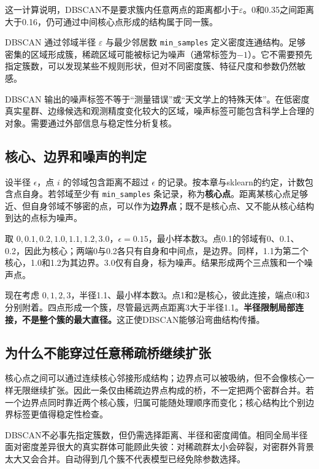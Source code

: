 这一计算说明，DBSCAN不是要求簇内任意两点的距离都小于$\varepsilon$。0和0.35之间距离大于0.16，仍可通过中间核心点形成的结构属于同一簇。

DBSCAN 通过邻域半径 $\varepsilon$ 与最少邻居数 \texttt{min\_samples} 定义密度连通结构。足够密集的区域形成簇，稀疏区域可能被标记为噪声（通常标签为$-1$）。它不需要预先指定簇数，可以发现某些不规则形状，但对不同密度簇、特征尺度和参数仍然敏感。


DBSCAN 输出的噪声标签不等于“测量错误”或“天文学上的特殊天体”。在低密度真实星群、边缘候选和观测精度变化较大的区域，噪声标签可能包含科学上合理的对象。需要通过外部信息与稳定性分析复核。

\subsection{核心、边界和噪声的判定}
设半径 $\epsilon$，点 $i$ 的邻域包含距离不超过 $\epsilon$ 的记录。按本章与sklearn的约定，计数包含点自身。若邻域至少有 \texttt{min\_samples} 条记录，称为\textbf{核心点}。距离某核心点足够近、但自身邻域不够密的点，可以作为\textbf{边界点}；既不是核心点、又不能从核心结构到达的点标为噪声。

取 $0,0.1,0.2,1.0,1.1,1.2,3.0$，$\epsilon=0.15$，最小样本数3。点0.1的邻域有0、0.1、0.2，因此为核心；两端0与0.2各只有自身和中间点，是边界。同样，1.1为第二个核心，1.0和1.2为其边界。3.0仅有自身，标为噪声。结果形成两个三点簇和一个噪声点。

现在考虑 $0,1,2,3$，半径1.1、最小样本数3。点1和2是核心，彼此连接，端点0和3分别附着。四点形成一个簇，尽管最远两点距离3大于半径1.1。\textbf{半径限制局部连接，不是整个簇的最大直径。}这正使DBSCAN能够沿弯曲结构传播。

\subsection{为什么不能穿过任意稀疏桥继续扩张}
核心点之间可以通过连续核心邻接形成结构；边界点可以被吸纳，但不会像核心一样无限继续扩张。因此一条仅由稀疏边界点构成的桥，不一定把两个密群合并。若一个边界点同时靠近两个核心簇，归属可能随处理顺序而变化；核心结构比个别边界标签更值得稳定性检查。

DBSCAN不必事先指定簇数，但仍需选择距离、半径和密度阈值。相同全局半径面对密度差异很大的真实群体可能顾此失彼：对稀疏群太小会碎裂，对密群外背景太大又会合并。自动得到几个簇不代表模型已经免除参数选择。

